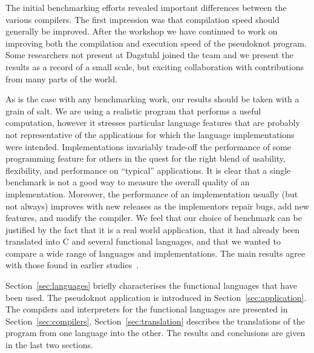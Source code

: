 The initial benchmarking efforts revealed important differences between
the various compilers. The first impression was that compilation speed
should generally be improved. After the workshop we have continued to
work on improving both the compilation and execution speed of the
pseudoknot program. Some researchers not present at Dagstuhl joined the
team and we present the results as a record of a small scale, but
exciting collaboration with contributions from many parts of the world.

As is the case with any benchmarking work, our results should be taken
with a grain of salt. We are using a realistic program that performs a
useful computation, however it stresses particular language features
that are probably not representative of the applications for which the
language implementations were intended. Implementations invariably
trade-off the performance of some programming feature for others in the
quest for the right blend of usability, flexibility, and performance on
``typical'' applications. It is clear that a single benchmark is not a
good way to measure the overall quality of an implementation.
Moreover, the performance of an implementation usually (but not always)
improves with new releases as the implementors repair bugs, add new
features, and modify the compiler. We feel that our choice of
benchmark can be justified by the fact that it is a real world
application, that it had already been translated into C and several
functional languages, and that we wanted to compare a wide range of
languages and implementations. The main results agree with those found
in earlier studies~\cite{Can92,Har92b}.

Section~\ref{sec:languages} briefly characterises the functional
languages that have been used. The pseudoknot application is introduced
in Section~\ref{sec:application}. The compilers and interpreters for
the functional languages are presented in Section~\ref{sec:compilers}.
Section~\ref{sec:translation} describes the translations of the program
from one language into the other. The results and conclusions are given
in the last two sections.

